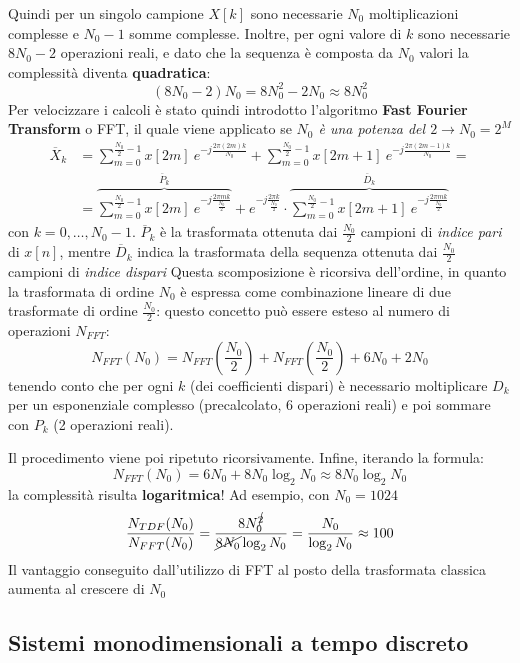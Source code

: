 \documentclass[
]{article}
\begin{document}
\begin{enumerate}
  Quindi per un singolo campione \(X[k]\) sono necessarie \(N_0\)
  moltiplicazioni complesse e \(N_0 -1\) somme complesse. Inoltre, per
  ogni valore di \(k\) sono necessarie \(8N_0 -2\) operazioni reali, e
  dato che la sequenza è composta da \(N_0\) valori la complessità
  diventa \textbf{quadratica}: \[
  (8N_0 -2)N_0 = 8N_{0}^{2} -2N_0 \approx 8N_{0}^2
  \] Per velocizzare i calcoli è stato quindi introdotto l'algoritmo
  \textbf{Fast Fourier Transform} o FFT, il quale viene applicato se
  \emph{\(N_0\) è una potenza del \(2 \to N_0 = 2^{M}\)} \begin{align*}
  \overline{X}_k &= \sum_{m=0}^{\frac{N_0}{2}-1} x[2m]\ e^{-j\frac{2\pi(2m)k}{N_0}} + \sum_{m=0}^{\frac{N_0}{2}-1} x[2m+1] \ e^{-j\frac{2\pi(2m-1)k}{N_0}}= \\
  & = \overbrace{\sum_{m=0}^{\frac{N_0}{2}-1} x[2m]\ e^{-j\frac{2\pi mk}{\frac{N_0}{2}}}}^{\overline{P}_k}+e^{-j\frac{2\pi k}{\frac{N_0}{2}}} \cdot \overbrace{\sum_{m=0}^{\frac{N_0}{2}-1} x[2m+1] \ e^{-j\frac{2\pi mk}{\frac{N_0}{2}}}}^{\overline{D}_k}
  \end{align*} con \(k= 0, \dots , N_0 -1\). \(\overline{P}_k\) è la
  trasformata ottenuta dai \(\frac{N_0}{2}\) campioni di \emph{indice
  pari} di \(x[n]\), mentre \(\overline{D}_k\) indica la trasformata
  della sequenza ottenuta dai \(\frac{N_0}{2}\) campioni di \emph{indice
  dispari} Questa scomposizione è ricorsiva dell'ordine, in quanto la
  trasformata di ordine \(N_0\) è espressa come combinazione lineare di
  due trasformate di ordine \(\frac{N_0}{2}\): questo concetto può
  essere esteso al numero di operazioni \(N_{FFT}\): \[
  N_{FFT}(N_0)=N_{FFT}(\frac{N_0}{2})+N_{FFT}(\frac{N_0}{2})+6N_0 + 2N_0
  \] tenendo conto che per ogni \(k\) (dei coefficienti dispari) è
  necessario moltiplicare \(D_k\) per un esponenziale complesso
  (precalcolato, 6 operazioni reali) e poi sommare con \(P_k\) (2
  operazioni reali).

  Il procedimento viene poi ripetuto ricorsivamente. Infine, iterando la
  formula: \[
  N_{FFT}(N_0) = 6N_0 + 8N_0\log_2 N_0 \approx 8N_0 \log_2 N_0
  \] la complessità risulta \textbf{logaritmica}! Ad esempio, con
  \(N_0=1024\) \[
  \frac{N_{TDF}(N_0)}{N_{FFT}(N_0)} = \frac{8N_{0}^{\cancel{2}}}{\cancel{8N_0}\log_2 N_0} = \frac{N_0}{\log_2 N_0} \approx 100
  \] Il vantaggio conseguito dall'utilizzo di FFT al posto della
  trasformata classica aumenta al crescere di \(N_0\)
\end{enumerate}

\subsection{Sistemi monodimensionali a tempo
discreto}\label{sistemi-monodimensionali-a-tempo-discreto}
\end{document}
